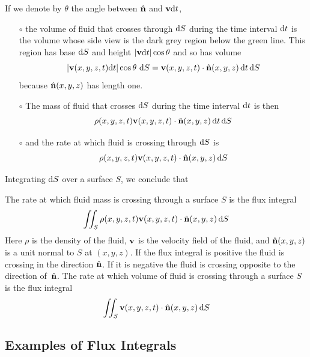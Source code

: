 If we denote by $\theta$ the angle between $\hat{\mathbf{n}}$ and $\mathbf{v}\mathrm{d}t$,
\begin{itemize}\itemsep1pt \parskip0pt  %
\item[$\circ$] 
the volume of fluid that crosses through $\mathrm{d}S$ during the time 
interval $\mathrm{d}t$ is the volume  whose side view is the dark grey 
region below the green line. This region has base $\mathrm{d}S$ and 
height $|\mathbf{v}\mathrm{d}t|\cos\theta$ and so has volume
\begin{equation*}
|\mathbf{v}(x,y,z,t)\mathrm{d}t|\cos\theta\ \mathrm{d}S
   =\mathbf{v}(x,y,z,t)\cdot\hat{\mathbf{n}}(x,y,z)\,\mathrm{d}t\,\mathrm{d}S
\end{equation*}
because $\hat{\mathbf{n}}(x,y,z)$ has length one. 
\item[$\circ$]
 The mass of fluid that crosses $\mathrm{d}S$ during the time interval $\mathrm{d}t$
 is then 
\begin{equation*}
\rho(x,y,z,t)\mathbf{v}(x,y,z,t)\cdot\hat{\mathbf{n}}(x,y,z)\,\mathrm{d}t\,\mathrm{d}S
\end{equation*}
\item[$\circ$]
and the rate at which fluid is crossing through $\mathrm{d}S$ is
\begin{equation*}
\rho(x,y,z,t)\mathbf{v}(x,y,z,t)\cdot\hat{\mathbf{n}}(x,y,z)\,\mathrm{d}S
\end{equation*}
\end{itemize}
Integrating $\mathrm{d}S$ over a surface $S$, we conclude that
\begin{lemma}\label{lem:fluxInterp}
The rate at which fluid mass is crossing through a surface $S$ is the flux integral
\begin{align*}
\iint_S \rho(x,y,z,t)\mathbf{v}(x,y,z,t)\cdot\hat{\mathbf{n}}(x,y,z)\,\mathrm{d}S
\end{align*}
Here $\rho$ is the density of the fluid, $\mathbf{v}$ is
the velocity field of the fluid, and $\hat{\mathbf{n}}(x,y,z)$ is a unit normal 
to $S$ at $(x,y,z)$.
If the flux integral is positive the fluid is crossing in the direction 
$\hat{\mathbf{n}}$. If it is negative the fluid is crossing opposite to the direction 
of~$\hat{\mathbf{n}}$. The rate at which volume of fluid is crossing through a surface $S$ is the flux integral
\begin{align*}
\iint_S \mathbf{v}(x,y,z,t)\cdot\hat{\mathbf{n}}(x,y,z)\,\mathrm{d}S
\end{align*}
\end{lemma}

\subsection{Examples of Flux Integrals}\label{sec:fluxEexamples}

